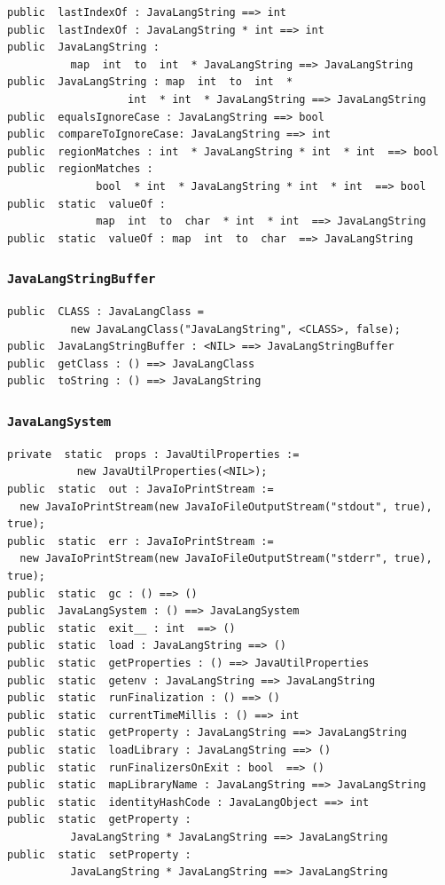 \documentclass[\pformat,12pt]{article}
\begin{document}
\begin{small}
\begin{verbatim}
public  lastIndexOf : JavaLangString ==> int
public  lastIndexOf : JavaLangString * int ==> int
public  JavaLangString : 
          map  int  to  int  * JavaLangString ==> JavaLangString
public  JavaLangString : map  int  to  int  * 
                   int  * int  * JavaLangString ==> JavaLangString
public  equalsIgnoreCase : JavaLangString ==> bool
public  compareToIgnoreCase: JavaLangString ==> int
public  regionMatches : int  * JavaLangString * int  * int  ==> bool
public  regionMatches : 
              bool  * int  * JavaLangString * int  * int  ==> bool
public  static  valueOf : 
              map  int  to  char  * int  * int  ==> JavaLangString
public  static  valueOf : map  int  to  char  ==> JavaLangString
\end{verbatim}
\end{small}

\subsubsection{\texttt{JavaLangStringBuffer}}
\begin{small}
\begin{verbatim}
public  CLASS : JavaLangClass =
          new JavaLangClass("JavaLangString", <CLASS>, false);
public  JavaLangStringBuffer : <NIL> ==> JavaLangStringBuffer
public  getClass : () ==> JavaLangClass
public  toString : () ==> JavaLangString
\end{verbatim}
\end{small}

\subsubsection{\texttt{JavaLangSystem}}
\begin{small}
\begin{verbatim}
private  static  props : JavaUtilProperties := 
           new JavaUtilProperties(<NIL>);
public  static  out : JavaIoPrintStream := 
  new JavaIoPrintStream(new JavaIoFileOutputStream("stdout", true), true);
public  static  err : JavaIoPrintStream := 
  new JavaIoPrintStream(new JavaIoFileOutputStream("stderr", true), true);
public  static  gc : () ==> ()
public  JavaLangSystem : () ==> JavaLangSystem
public  static  exit__ : int  ==> ()
public  static  load : JavaLangString ==> ()
public  static  getProperties : () ==> JavaUtilProperties
public  static  getenv : JavaLangString ==> JavaLangString
public  static  runFinalization : () ==> ()
public  static  currentTimeMillis : () ==> int
public  static  getProperty : JavaLangString ==> JavaLangString
public  static  loadLibrary : JavaLangString ==> ()
public  static  runFinalizersOnExit : bool  ==> ()
public  static  mapLibraryName : JavaLangString ==> JavaLangString
public  static  identityHashCode : JavaLangObject ==> int
public  static  getProperty : 
          JavaLangString * JavaLangString ==> JavaLangString
public  static  setProperty : 
          JavaLangString * JavaLangString ==> JavaLangString
\end{verbatim}
\end{small}
\end{document}
